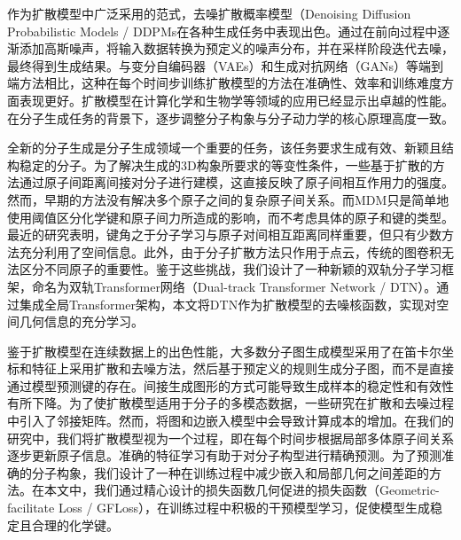 作为扩散模型中广泛采用的范式，去噪扩散概率模型（Denoising Diffusion Probabilistic Models / DDPMs\cite{ddpm_ho_20,dpm_jascha_15}在各种生成任务中表现出色。通过在前向过程中逐渐添加高斯噪声，将输入数据转换为预定义的噪声分布，并在采样阶段迭代去噪，最终得到生成结果。与变分自编码器（VAEs）\cite{vae_kingma_13}和生成对抗网络（GANs）\cite{gan_goodfellow_14}等端到端方法相比，这种在每个时间步训练扩散模型的方法在准确性、效率和训练难度方面表现更好。扩散模型在计算化学\cite{edm_hoogeboom_22,targetdiff_guan_23}和生物学\cite{diffab_luo_22,protseed_shi_23}等领域的应用已经显示出卓越的性能。在分子生成任务的背景下，逐步调整分子构象与分子动力学的核心原理高度一致。

全新的分子生成是分子生成领域一个重要的任务，该任务要求生成有效、新颖且结构稳定的分子。为了解决生成的3D构象所要求的等变性条件，一些基于扩散的方法\cite{edm_hoogeboom_22,mdm_huang_23}通过原子间距离间接对分子进行建模，这直接反映了原子间相互作用力的强度。然而，早期的方法\cite{edm_hoogeboom_22}没有解决多个原子之间的复杂原子间关系。而MDM\cite{mdm_huang_23}只是简单地使用阈值区分化学键和原子间力所造成的影响，而不考虑具体的原子和键的类型。最近的研究\cite{moleformer_yuan_23}表明，键角之于分子学习与原子对间相互距离同样重要，但只有少数方法充分利用了空间信息。此外，由于分子扩散方法只作用于点云，传统的图卷积无法区分不同原子的重要性。鉴于这些挑战，我们设计了一种新颖的双轨分子学习框架，命名为双轨Transformer网络（Dual-track Transformer Network / DTN）。通过集成全局Transformer架构，本文将DTN作为扩散模型的去噪核函数，实现对空间几何信息的充分学习。

鉴于扩散模型在连续数据上的出色性能，大多数分子图生成模型采用了在笛卡尔坐标和特征上采用扩散和去噪方法，然后基于预定义的规则生成分子图，而不是直接通过模型预测键的存在。间接生成图形的方式可能导致生成样本的稳定性和有效性有所下降。为了使扩散模型适用于分子的多模态数据，一些研究\cite{edpgnn_niu_20,digress_vignac_22,midi_vignac_23}在扩散和去噪过程中引入了邻接矩阵。然而，将图和边嵌入模型中会导致计算成本的增加。在我们的研究中，我们将扩散模型视为一个过程，即在每个时间步根据局部多体原子间关系逐步更新原子信息。准确的特征学习有助于对分子构型进行精确预测。为了预测准确的分子构象，我们设计了一种在训练过程中减少嵌入和局部几何之间差距的方法。在本文中，我们通过精心设计的损失函数几何促进的损失函数（Geometric-facilitate Loss / GFLoss），在训练过程中积极的干预模型学习，促使模型生成稳定且合理的化学键。

